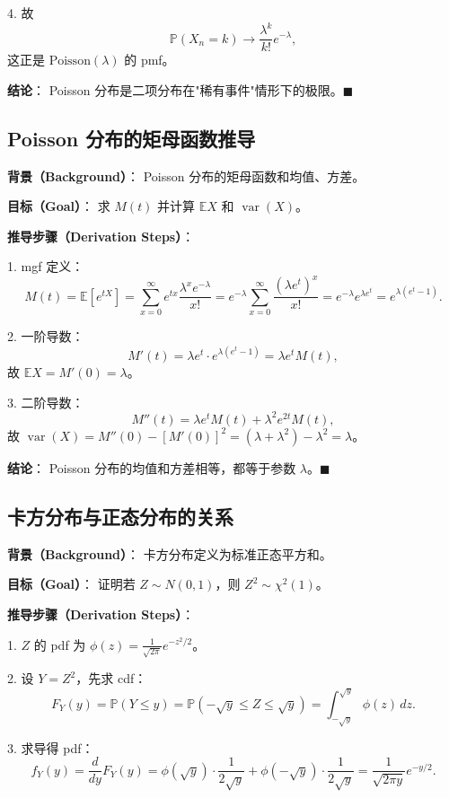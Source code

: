4. 故
\[
\mathbb{P}(X_n = k) \to \frac{\lambda^k}{k!} e^{-\lambda},
\]
这正是 $\text{Poisson}(\lambda)$ 的 pmf。

\textbf{结论}：
Poisson 分布是二项分布在"稀有事件"情形下的极限。$\blacksquare$

\subsection{Poisson 分布的矩母函数推导}\label{sec:poisson-mgf-derivation}

\textbf{背景（Background）}：
Poisson 分布的矩母函数和均值、方差。

\textbf{目标（Goal）}：
求 $M(t)$ 并计算 $\mathbb{E}X$ 和 $\operatorname{var}(X)$。

\textbf{推导步骤（Derivation Steps）}：

1. mgf 定义：
\[
M(t) = \mathbb{E}[e^{tX}] = \sum_{x=0}^\infty e^{tx} \frac{\lambda^x e^{-\lambda}}{x!} = e^{-\lambda} \sum_{x=0}^\infty \frac{(\lambda e^t)^x}{x!} = e^{-\lambda} e^{\lambda e^t} = e^{\lambda(e^t - 1)}.
\]

2. 一阶导数：
\[
M'(t) = \lambda e^t \cdot e^{\lambda(e^t - 1)} = \lambda e^t M(t),
\]
故 $\mathbb{E}X = M'(0) = \lambda$。

3. 二阶导数：
\[
M''(t) = \lambda e^t M(t) + \lambda^2 e^{2t} M(t),
\]
故 $\operatorname{var}(X) = M''(0) - [M'(0)]^2 = (\lambda + \lambda^2) - \lambda^2 = \lambda$。

\textbf{结论}：
Poisson 分布的均值和方差相等，都等于参数 $\lambda$。$\blacksquare$

\subsection{卡方分布与正态分布的关系}\label{sec:chi-square-from-normal}

\textbf{背景（Background）}：
卡方分布定义为标准正态平方和。

\textbf{目标（Goal）}：
证明若 $Z \sim N(0,1)$，则 $Z^2 \sim \chi^2(1)$。

\textbf{推导步骤（Derivation Steps）}：

1. $Z$ 的 pdf 为 $\phi(z) = \frac{1}{\sqrt{2\pi}} e^{-z^2/2}$。

2. 设 $Y = Z^2$，先求 cdf：
\[
F_Y(y) = \mathbb{P}(Y \leq y) = \mathbb{P}(-\sqrt{y} \leq Z \leq \sqrt{y}) = \int_{-\sqrt{y}}^{\sqrt{y}} \phi(z) \, dz.
\]

3. 求导得 pdf：
\[
f_Y(y) = \frac{d}{dy} F_Y(y) = \phi(\sqrt{y}) \cdot \frac{1}{2\sqrt{y}} + \phi(-\sqrt{y}) \cdot \frac{1}{2\sqrt{y}} = \frac{1}{\sqrt{2\pi y}} e^{-y/2}.
\]

